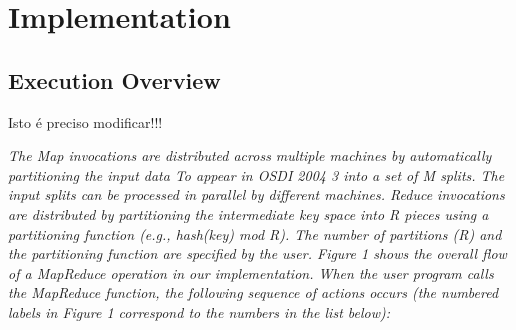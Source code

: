 \section {Implementation}



\subsection {Execution Overview}


{\LARGE{Isto é preciso modificar!!!}}

 \it\tiny
The Map invocations are distributed across multiple
machines by automatically partitioning the input data
To appear in OSDI 2004 3
into a set of M splits. The input splits can be processed
in parallel by different machines. Reduce invocations
are distributed by partitioning the intermediate key
space into R pieces using a partitioning function (e.g.,
hash(key) mod R). The number of partitions (R) and
the partitioning function are specified by the user.
Figure 1 shows the overall flow of a MapReduce operation
in our implementation. When the user program
calls the MapReduce function, the following sequence
of actions occurs (the numbered labels in Figure 1 correspond
to the numbers in the list below):


